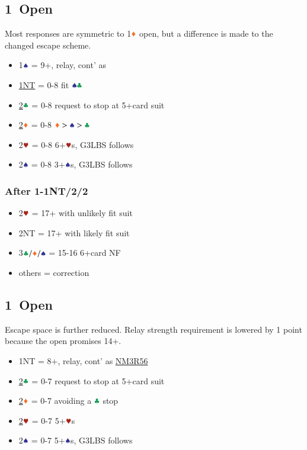 \documentclass{article}
\begin{document}
\begin{multicols}{2}
\subsection{1\HHH\ Open}\label{sec:1h}
Most responses are symmetric to 1$\ddd$ open, but a difference is made to the changed escape scheme.
\begin{itemize}
    \item 1$\sss$ = 9+, relay, cont' as 
    \item \hyperref[sec:1h-escape]{1NT} = 0-8 fit $\sss\ccc$
    \item \hyperref[sec:1h-escape]{2$\ccc$} = 0-8 request to stop at 5+card suit
    \item \hyperref[sec:1h-escape]{2$\ddd$} = 0-8 $\ddd>\sss>\ccc$
    \item 2$\hhh$ = 0-8 6+$\hhh$s, G3LBS follows
    \item 2$\sss$ = 0-8 3+$\sss$s, G3LBS follows
\end{itemize}

\subsubsection{After 1\HHH-1NT/2\CCC/2\DDD}\label{sec:1h-escape}
\begin{itemize}
    \item 2$\hhh$ = 17+ with unlikely fit suit
    \item 2NT = 17+ with likely fit suit
    \item 3$\ccc/\ddd/\sss$ = 15-16 6+card NF
    \item others = correction
\end{itemize}

\subsection{1\SSS\ Open}\label{sec:1s}
Escape space is further reduced. Relay strength requirement is lowered by 1 point because the open promises 14+.
\begin{itemize}
    \item 1NT = 8+, relay, cont' as \hyperref[sec:nlm3r56]{NM3R56}
    \item \hyperref[sec:1s-escape]{2$\ccc$} = 0-7 request to stop at 5+card suit
    \item \hyperref[sec:1s-escape]{2$\ddd$} = 0-7 avoiding a $\ccc$ stop
    \item \hyperref[sec:1s-escape]{2$\hhh$} = 0-7 5+$\hhh$s
    \item 2$\sss$ = 0-7 5+$\sss$s, G3LBS follows
\end{itemize}


\end{multicols}
\end{document}
